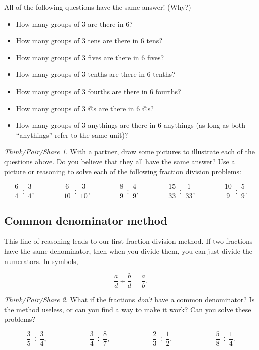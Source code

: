 \documentclass[10pt, reqno]{amsart}
\theoremstyle{remark}
\newtheorem*{thinkpair*}{Think/Pair/Share}
\theoremstyle{definition}
\numberwithin{equation}{section}  %
\begin{document}
All of the following questions have the same answer!  (Why?)
\begin{itemize}
\item
How many groups of 3 are there in 6?
\item
How many groups of 3 tens are there in 6 tens?
\item
How many groups of 3 fives are there in 6 fives?
\item
How many groups of 3 tenths are there in 6 tenths?
\item
How many groups of 3 fourths are there in 6 fourths?
\item
How many groups of 3 @s are there in 6 @s?
\item
How many groups of 3 anythings are there in 6 anythings (as long as both ``anythings'' refer to the same unit)?
\end{itemize}



\begin{thinkpair*}
With a partner, draw some pictures to illustrate each of the questions above.  Do you believe that they all have the same answer?  Use a picture or reasoning to solve each of the following fraction division problems:

\[
\frac 6 4 \div \frac 3 4,
\qquad\qquad
\frac 6{10} \div \frac 3{10},
\qquad\qquad
\frac 8 9 \div \frac 4 9,
\qquad\qquad
\frac{15}{33} \div \frac{1}{33},
\qquad\qquad
\frac{10}9 \div \frac{5}9.
\]

\end{thinkpair*}

\subsection{Common denominator method}
This line of reasoning leads  to our first fraction division method.  
If two fractions have the same denominator, then when you divide them, you can just divide the numerators.  In symbols,

\[
\frac a d \div \frac b d = \frac a b.
\]


\begin{thinkpair*}
What if the fractions \emph{don't} have a common denominator?  Is the method useless, or can you find a way to make it work?  Can you solve these problems?

\[
\frac 3 5 \div \frac 3 4,
\qquad\qquad\qquad
\frac 3 4  \div \frac 8 7,
\qquad\qquad\qquad
\frac 2 3  \div \frac 1 2,
\qquad\qquad\qquad
\frac 5 8  \div \frac 1 4.
\]
\end{thinkpair*}
\end{document}
